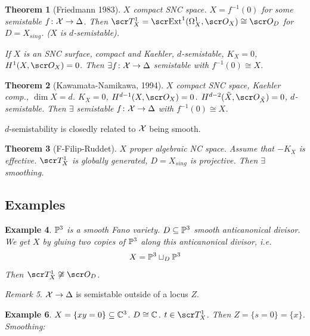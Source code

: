 \documentclass[A4paper, british]{amsart}
\theoremstyle{darkgreentheorem}
\newtheorem{thm}{Theorem}[section]
\theoremstyle{darkbluedefinition}
\theoremstyle{darkredexample}
\newtheorem{exa}[thm]{Example}
\theoremstyle{remark}
\newtheorem{rem}[thm]{Remark}
\DeclareMathOperator{\ext}{\E xt}
\newcommand{\1}{\mathbbm{1}}
\newcommand{\sub}{\subseteq}
\begin{document}
\begin{thm}[Friedmann 1983]
    $X$ compact SNC space.
    $X=f^{-1}(0)$ for some semistable $f\colon \X\to \Delta$.
    Then $\sT_{X}^{1}=\ext^{1}(\Omega_{X}^{1},\O_{X})\cong \O_{D}$ for $D=X_{sing}$.
    ($X$ is $d$-semistable).

    If $X$ is an SNC surface, compact and Kaehler, $d$-semistable, $K_{X}=0$, $H^{1}(X,\O_{X})=0$.
    Then $\exists f\colon \X\to \Delta$ semistable with $f^{-1}(0)\cong X$.
\end{thm}

\begin{thm}[Kawamata-Namikawa, 1994]
    $X$ compact SNC space, Kaehler comp., $\dim{X}=d$.
    $K_{X}=0$, $H^{d-1}(X,\O_{X})=0$. $H^{d-2}(\tilde{X},\O_{\tilde{X}})=0$, $d$-semistable.
    Then $\exists $ semistable $f\colon \X\to \Delta$ with $f^{-1}(0)\cong X$.
\end{thm}

$d$-semistability is closedly related to $\X$ being smooth.

\begin{thm}[F-Filip-Ruddet]
    $X$ proper algebraic NC space.
    Assume that $-K_{X}$ is effective.
    $\sT_{X}^{1}$ is globally generated, $D=X_{sing}$ is projective.
    Then $\exists$ smoothing.
\end{thm}

\subsection{Examples}

\begin{exa}
    $\P^{3}$ is a smooth Fano variety.
    $D\sub \P^{3}$ smooth anticanonical divisor.
    We get $X$ by gluing two copies of $\P^{3}$ along this anticanonical divisor, i.e.
    \[ X=\P^{3}\sqcup_{D}\P^{3} \]
    Then $\sT_{X}^{1}\not\cong \O_{D}$.
\end{exa}

\begin{rem}
    $\X\to \Delta$ is semistable outside of a locus $Z$.
\end{rem}

\begin{exa}
    $X=\{xy=0\}\sub \C^{3}$.
    $D\cong \C$.
    $t\in \sT_{X}^{1}$.
    Then $Z=\{s=0\}=\{x\}$.
    Smoothing:
    \begin{center}
    \end{center}
\end{exa}
\end{document}
